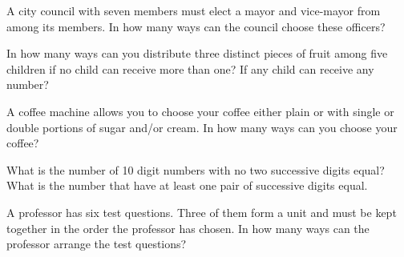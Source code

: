 \documentclass[12pt,letterpaper,boxed]{amspset}
\begin{document}

\begin{problem}[1.1.1]
A city council with seven members must elect a mayor and vice-mayor
from among its members. In how many ways can the council choose these
officers?
\end{problem}

\begin{solution}

\end{solution}



\begin{problem}[1.1.2]
In how many ways can you distribute three distinct pieces of fruit
among five children if no child can receive more than one? If any
child can receive any number?
\end{problem}

\begin{solution}

\end{solution}



\begin{problem}[1.1.8]
A coffee machine allows you to choose your coffee either plain or with
single or double portions of sugar and/or cream. In how many ways can
you choose your coffee?
\end{problem}

\begin{solution}

\end{solution}



\begin{problem}[1.1.9]
What is the number of 10 digit numbers with no two successive digits
equal? What is the number that have at least one pair of successive
digits equal.
\end{problem}

\begin{solution}

\end{solution}



\begin{problem}[1.1.13]
A professor has six test questions. Three of them form a unit and must
be kept together in the order the professor has chosen. In how many
ways can the professor arrange the test questions?
\end{problem}
\end{document}

